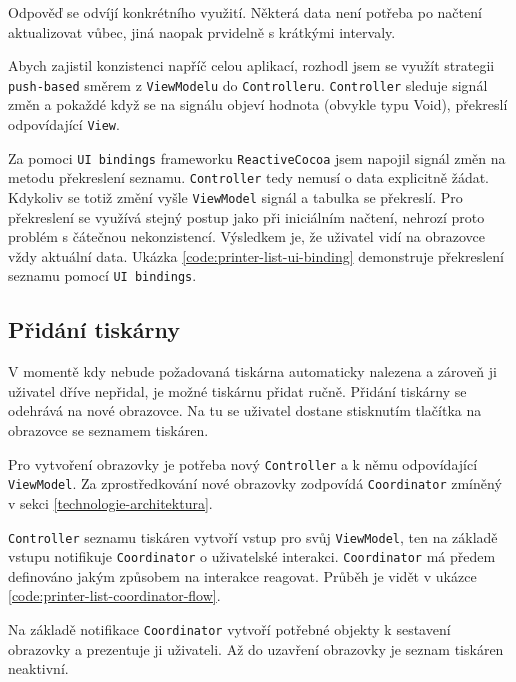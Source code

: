 Odpověď se odvíjí konkrétního využití.
Některá data není potřeba po načtení aktualizovat vůbec, jiná naopak prvidelně s krátkými intervaly.

\bigskip

Abych zajistil konzistenci napříč celou aplikací, rozhodl jsem se využít strategii \texttt{push-based} směrem z \texttt{ViewModelu} do \texttt{Controlleru}.
\texttt{Controller} sleduje signál změn a pokaždé když se na signálu objeví hodnota (obvykle typu Void), překreslí odpovídající \texttt{View}.

Za pomoci \texttt{UI bindings} frameworku \texttt{ReactiveCocoa} jsem napojil signál změn na metodu překreslení seznamu.
\texttt{Controller} tedy nemusí o data explicitně žádat.
Kdykoliv se totiž změní vyšle \texttt{ViewModel} signál a tabulka se překreslí.
Pro překreslení se využívá stejný postup jako při iniciálním načtení, nehrozí proto problém s čátečnou nekonzistencí.
Výsledkem je, že uživatel vidí na obrazovce vždy aktuální data.
Ukázka \ref{code:printer-list-ui-binding} demonstruje překreslení seznamu pomocí \texttt{UI bindings}.


\subsection{Přidání tiskárny}

V momentě kdy nebude požadovaná tiskárna automaticky nalezena a zároveň ji uživatel dříve nepřidal, je možné tiskárnu přidat ručně.
Přidání tiskárny se odehrává na nové obrazovce.
Na tu se uživatel dostane stisknutím tlačítka \uv{+} na obrazovce se seznamem tiskáren.

Pro vytvoření obrazovky je potřeba nový \texttt{Controller} a k němu odpovídající \texttt{ViewModel}.
Za zprostředkování nové obrazovky zodpovídá \texttt{Coordinator} zmíněný v sekci \ref{technologie-architektura}.

\texttt{Controller} seznamu tiskáren vytvoří vstup pro svůj \texttt{ViewModel}, ten na základě vstupu notifikuje \texttt{Coordinator} o uživatelské interakci.
\texttt{Coordinator} má předem definováno jakým způsobem na interakce reagovat.
Průběh je vidět v ukázce \ref{code:printer-list-coordinator-flow}.

Na základě notifikace \texttt{Coordinator} vytvoří potřebné objekty k sestavení obrazovky a prezentuje ji uživateli.
Až do uzavření obrazovky je seznam tiskáren neaktivní.

